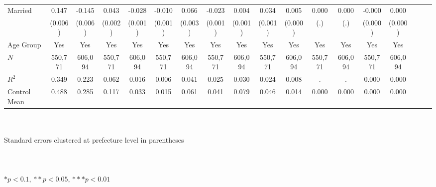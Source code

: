 \documentclass[serif, aspectratio=169]{beamer}
\begin{document}
\begin{frame}[label=different_types_placebo]
\begin{table}[htbp]
{\begin{tabular}{@{}l*{17}{c}@{}}
\addlinespace
Married   &    0.147\sym{***}&   -0.145\sym{***}&    0.043\sym{***}&   -0.028\sym{***}&   -0.010\sym{***}&    0.066\sym{***}&   -0.023\sym{***}&    0.004\sym{***}&    0.034\sym{***}&    0.005\sym{***}&    0.000         &    0.000         &   -0.000         &    0.000         \\
          &  (0.006)         &  (0.006)         &  (0.002)         &  (0.001)         &  (0.001)         &  (0.003)         &  (0.001)         &  (0.001)         &  (0.001)         &  (0.000)         &      (.)         &      (.)         &  (0.000)         &  (0.000)         \\
\addlinespace
Age Group &      Yes         &      Yes         &      Yes         &      Yes         &      Yes         &      Yes         &      Yes         &      Yes         &      Yes         &      Yes         &      Yes         &      Yes         &      Yes         &      Yes         \\
\midrule
$\textit{N}$&  550,771         &  606,094         &  550,771         &  606,094         &  550,771         &  606,094         &  550,771         &  606,094         &  550,771         &  606,094         &  550,771         &  606,094         &  550,771         &  606,094         \\
$\textit{R}^2$&    0.349         &    0.223         &    0.062         &    0.016         &    0.006         &    0.041         &    0.025         &    0.030         &    0.024         &    0.008         &        .         &        .         &    0.000         &    0.000         \\
Control Mean&    0.488         &    0.285         &    0.117         &    0.033         &    0.015         &    0.061         &    0.041         &    0.079         &    0.046         &    0.014         &    0.000         &    0.000         &    0.000         &    0.000         \\
\bottomrule
\end{tabular}}
\raggedright
\\\\{\linewidth}{\tiny Standard errors clustered at prefecture level in parentheses}\\\\
\vspace{-0.2cm}
\\\\{\linewidth}{\tiny $*p<0.1$, $**p<0.05$, $***p<0.01$}\\\\

\end{table}
\end{frame}
\end{document}

